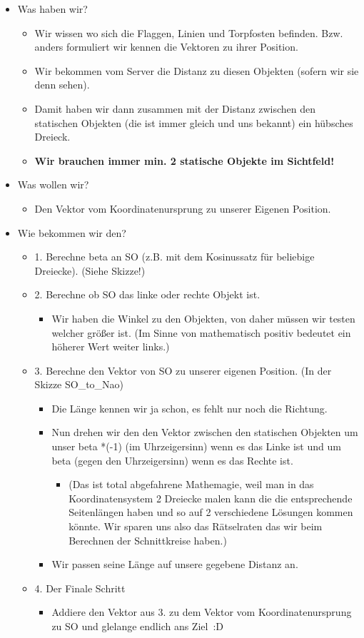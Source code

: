 \begin{itemize}
\item Was haben wir?
\begin{itemize}
	\item  Wir wissen wo sich die Flaggen, Linien und Torpfosten befinden.
 Bzw. anders formuliert wir kennen die Vektoren zu ihrer Position.
	\item  Wir bekommen vom Server die Distanz zu diesen Objekten (sofern wir sie denn sehen).
	\item  Damit haben wir dann zusammen mit der Distanz zwischen den 
statischen Objekten (die ist immer gleich und uns bekannt) ein hübsches 
Dreieck.
	\item   \textbf{ Wir brauchen immer min. 2 statische Objekte im Sichtfeld!}
\end{itemize}
\item  Was wollen wir?
\begin{itemize}
	\item  Den Vektor vom Koordinatenursprung zu unserer Eigenen Position.
\end{itemize}
\item  Wie bekommen wir den? 
\begin{itemize}
	\item  1. Berechne beta an SO (z.B. mit dem Kosinussatz für beliebige Dreiecke). (Siehe Skizze!)
	\item  2. Berechne ob SO das linke oder rechte Objekt ist.
	\begin{itemize}
		\item  Wir haben die Winkel zu den Objekten, von daher müssen wir 
testen welcher größer ist. (Im Sinne von mathematisch positiv bedeutet 
ein höherer Wert weiter links.)
	\end{itemize}
	\item  3. Berechne den Vektor von SO zu unserer eigenen Position. (In der Skizze SO\_to\_Nao)
	\begin{itemize}
		\item  Die Länge kennen wir ja schon, es fehlt nur noch die Richtung.
		\item  Nun drehen wir den den Vektor zwischen den statischen Objekten
 um unser beta *(-1) (im Uhrzeigersinn) wenn es das Linke ist und um 
beta (gegen den Uhrzeigersinn) wenn es das Rechte ist.
		\begin{itemize}
			\item  (Das ist total abgefahrene Mathemagie, weil man in das 
Koordinatensystem 2 Dreiecke malen kann die die entsprechende 
Seitenlängen haben und so auf 2 verschiedene Lösungen kommen könnte. Wir
 sparen uns also das Rätselraten das wir beim Berechnen der 
Schnittkreise haben.)
		\end{itemize}
		\item  Wir passen seine Länge auf unsere gegebene Distanz an.
	\end{itemize}
	\item  4. Der Finale Schritt
	\begin{itemize}
		\item  Addiere den Vektor aus 3. zu dem Vektor vom Koordinatenursprung zu SO und glelange endlich ans Ziel~:D
	\end{itemize}
\end{itemize}
\end{itemize}
